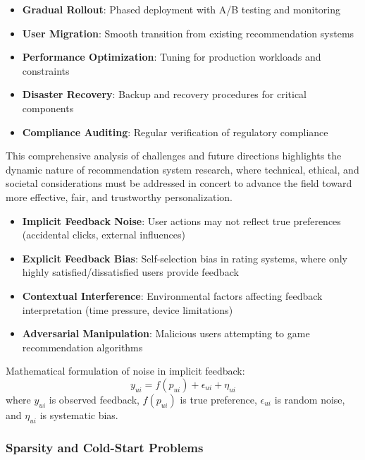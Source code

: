 \begin{itemize}
    \item \textbf{Gradual Rollout}: Phased deployment with A/B testing and monitoring
    \item \textbf{User Migration}: Smooth transition from existing recommendation systems
    \item \textbf{Performance Optimization}: Tuning for production workloads and constraints
    \item \textbf{Disaster Recovery}: Backup and recovery procedures for critical components
    \item \textbf{Compliance Auditing}: Regular verification of regulatory compliance
\end{itemize}

This comprehensive analysis of challenges and future directions highlights the dynamic nature of recommendation system research, where technical, ethical, and societal considerations must be addressed in concert to advance the field toward more effective, fair, and trustworthy personalization.

\begin{itemize}
    \item \textbf{Implicit Feedback Noise}: User actions may not reflect true preferences (accidental clicks, external influences)
    \item \textbf{Explicit Feedback Bias}: Self-selection bias in rating systems, where only highly satisfied/dissatisfied users provide feedback
    \item \textbf{Contextual Interference}: Environmental factors affecting feedback interpretation (time pressure, device limitations)
    \item \textbf{Adversarial Manipulation}: Malicious users attempting to game recommendation algorithms
\end{itemize}

Mathematical formulation of noise in implicit feedback:
\begin{equation}
y_{ui} = f(p_{ui}) + \epsilon_{ui} + \eta_{ui}
\end{equation}
where $y_{ui}$ is observed feedback, $f(p_{ui})$ is true preference, $\epsilon_{ui}$ is random noise, and $\eta_{ui}$ is systematic bias.

\subsubsection{Sparsity and Cold-Start Problems}

